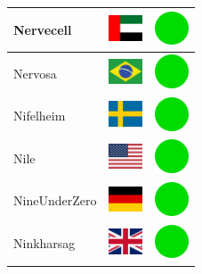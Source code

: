 \documentclass[12pt, a4paper, twoside]{report}
\begin{document}
\begin{center}
\begin{longtable}{|p{5cm}|p{2cm}|p{2cm}|}
Nervecell & \includegraphics[width=1cm]{4x3/ae} & \includegraphics[width=1cm]{likes/y} \\ \hline
Nervosa & \includegraphics[width=1cm]{4x3/br} & \includegraphics[width=1cm]{likes/y} \\ \hline
Nifelheim & \includegraphics[width=1cm]{4x3/se} & \includegraphics[width=1cm]{likes/y} \\ \hline
Nile & \includegraphics[width=1cm]{4x3/us} & \includegraphics[width=1cm]{likes/y} \\ \hline
NineUnderZero & \includegraphics[width=1cm]{4x3/de} & \includegraphics[width=1cm]{likes/y} \\ \hline
Ninkharsag & \includegraphics[width=1cm]{4x3/gb} & \includegraphics[width=1cm]{likes/y} \\ \hline

\end{longtable}
\end{center}
\end{document}
